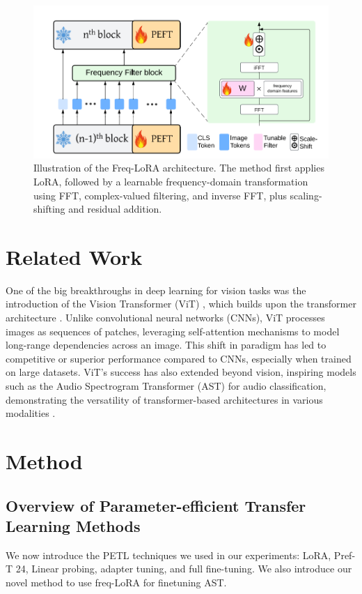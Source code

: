 \documentclass[11pt]{article}
\begin{document}
\begin{figure}[ht]
    \centering
    \includegraphics[width=1.2\linewidth]{freq_image.png}
    \caption{Illustration of the Freq-LoRA architecture. The method first applies LoRA, followed by a learnable frequency-domain transformation using FFT, complex-valued filtering, and inverse FFT, plus scaling-shifting and residual addition.}
    \label{fig:freq-lora}
\end{figure}
\section{Related Work}
One of the big breakthroughs in deep learning for vision tasks was the introduction of the Vision Transformer (ViT) \cite{dosovitskiy2020image}, which builds upon the transformer architecture \cite{vaswani2017attention}. Unlike convolutional neural networks (CNNs), ViT processes images as sequences of patches, leveraging self-attention mechanisms to model long-range dependencies across an image. This shift in paradigm has led to competitive or superior performance compared to CNNs, especially when trained on large datasets. ViT’s success has also extended beyond vision, inspiring models such as the Audio Spectrogram Transformer (AST) for audio classification, demonstrating the versatility of transformer-based architectures in various modalities \cite{gong2021ast}.


\section{Method}
\subsection{Overview of Parameter-efficient Transfer Learning Methods}

We now introduce the PETL techniques we used in our experiments: LoRA, Pref-T 24, Linear probing, adapter tuning, and full fine-tuning.
We also introduce our novel method to use freq-LoRA for finetuning AST.
\end{document}
